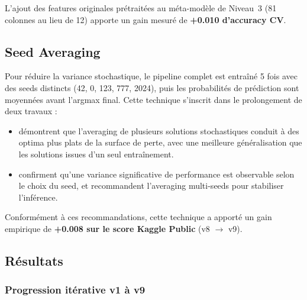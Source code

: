 \documentclass[11pt,a4paper]{article}
\begin{document}
L'ajout des features originales prétraitées au méta-modèle de Niveau~3
(81 colonnes au lieu de 12) apporte un gain mesuré de \textbf{+0.010
d'accuracy CV}.

\subsection{Seed Averaging}

Pour réduire la variance stochastique, le pipeline complet est entraîné
5 fois avec des seeds distincts (42, 0, 123, 777, 2024), puis les
probabilités de prédiction sont moyennées avant l'argmax final. Cette
technique s'inscrit dans le prolongement de deux travaux :

\begin{itemize}
  \item \textcite{izmailov2018} démontrent que l'averaging de plusieurs
    solutions stochastiques conduit à des optima plus plats de la surface
    de perte, avec une meilleure généralisation que les solutions issues
    d'un seul entraînement.
  \item \textcite{zhou2025} confirment qu'une variance significative de
    performance est observable selon le choix du seed, et recommandent
    l'averaging multi-seeds pour stabiliser l'inférence.
\end{itemize}

Conformément à ces recommandations, cette technique a apporté un gain
empirique de \textbf{+0.008 sur le score Kaggle Public} (v8 $\to$ v9).

\subsection{Résultats}

\subsubsection{Progression itérative v1 à v9}
\end{document}

